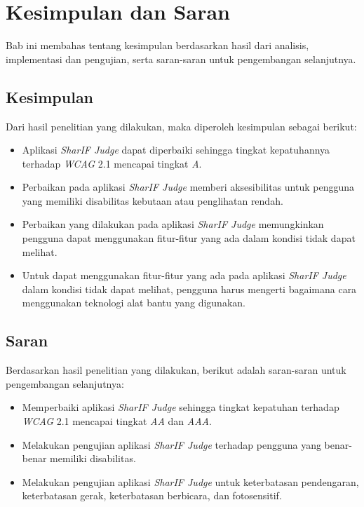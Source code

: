 \chapter{Kesimpulan dan Saran}
\label{chap:kesimpulan_dan_saran}

Bab ini membahas tentang kesimpulan berdasarkan hasil dari analisis, implementasi dan pengujian, serta saran-saran untuk pengembangan selanjutnya.

\section{Kesimpulan}
\label{sec:kesimpulan}
Dari hasil penelitian yang dilakukan, maka diperoleh kesimpulan sebagai berikut:
\begin{itemize}
	\item Aplikasi \textit{SharIF Judge} dapat diperbaiki sehingga tingkat kepatuhannya terhadap \textit{WCAG} 2.1 mencapai tingkat \textit{A}.
	\item Perbaikan pada aplikasi \textit{SharIF Judge} memberi aksesibilitas untuk pengguna yang memiliki disabilitas kebutaan atau penglihatan rendah.
	\item Perbaikan yang dilakukan pada aplikasi \textit{SharIF Judge} memungkinkan pengguna dapat menggunakan fitur-fitur yang ada dalam kondisi tidak dapat melihat.
	\item Untuk dapat menggunakan fitur-fitur yang ada pada aplikasi \textit{SharIF Judge} dalam kondisi tidak dapat melihat, pengguna harus mengerti bagaimana cara menggunakan teknologi alat bantu yang digunakan.
\end{itemize}

\section{Saran}
\label{sec:saran}
Berdasarkan hasil penelitian yang dilakukan, berikut adalah saran-saran untuk pengembangan selanjutnya:
\begin{itemize}
	\item Memperbaiki aplikasi \textit{SharIF Judge} sehingga tingkat kepatuhan terhadap \textit{WCAG} 2.1 mencapai tingkat \textit{AA} dan \textit{AAA}.
	\item Melakukan pengujian aplikasi \textit{SharIF Judge} terhadap pengguna yang benar-benar memiliki disabilitas.
	\item Melakukan pengujian aplikasi \textit{SharIF Judge} untuk keterbatasan pendengaran, keterbatasan gerak, keterbatasan berbicara, dan fotosensitif.
\end{itemize}